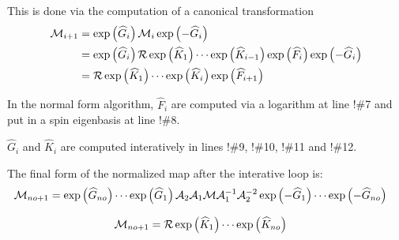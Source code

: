 \documentclass{hitec}     %
\begin{document}
{{{{{{{This is done via the computation of a canonical transformation 
%
\begin{align} {{\cal M}}_{i+1}&=
\exp\left({{\widehat{G}}_{i}}\right){{\cal M}}_{i}\exp\left({-{\widehat{G}}_{i}}\right)\nonumber \\
 &=\exp\left({{\widehat{G}}_{i}}\right){\cal R}\exp\left({{\widehat{K}}_{1}}\right)\cdots\exp\left({{\widehat{K}}_{i-1}}\right)\exp\left({{\widehat{F}}_{i}}\right)\exp\left({-{\widehat{G}}_{i}}\right)\nonumber \\
 &={\cal R}\exp\left({{\widehat{K}}_{1}}\right)\cdots\exp\left({{\widehat{K}}_{i}}\right)\exp\left({{\widehat{F}}_{i+1}}\right) \end{align}




In the normal form algorithm, ${{\widehat{F}}_{i}}$  are  computed via a logarithm at line !\#7  and put in a spin eigenbasis at line !\#8.


 ${{\widehat{G}}_{i}}$  and ${{\widehat{K}}_{i}}$  are computed interatively in lines  !\#9, !\#10, !\#11 and !\#12. 

The final form of the normalized map after the interative loop is:
%
\begin{align} {{\cal M}}_{no+1}&=
\exp\left({{\widehat{G}}_{no}}\right)\cdots\exp\left({{\widehat{G}}_{1}}\right){{\cal A}}_{2}{{\cal A}}_{1}{\cal M}{{\cal A}}_{1}^{-1}{{\cal A}}_{2}^{-2}\exp\left({-{\widehat{G}}_{1}}\right)\cdots\exp\left({-{\widehat{G}}_{no}}\right)\label{eq:mno}\end{align}

%
\begin{align} {{\cal M}}_{no+1}&=
{\cal R}\exp\left({{\widehat{K}}_{1}}\right)\cdots\exp\left({{\widehat{K}}_{no}}\right) \label{eq:finalnom}\end{align}


}}}}}}}
\end{document}
